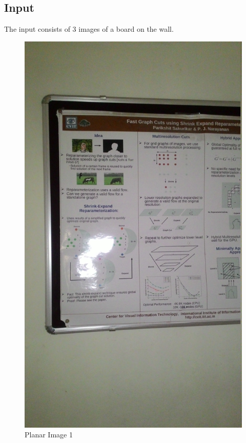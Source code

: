 \documentclass[12pt]{article}
\begin{document}
\subsection{Input}
The input consists of 3 images of a board on the wall.

\begin{figure}[h]
\centering
\begin{minipage}{0.7\textwidth}
\centering
\includegraphics[scale = 0.07]{planar1.jpg}
\caption{Planar Image 1}
\label{fig:Image 1}

\end{minipage}
\end{figure}
\end{document}
